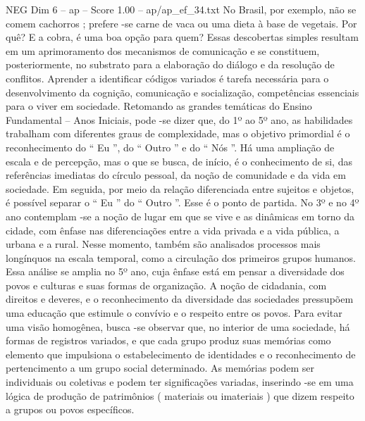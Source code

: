 \begin{textsample}{NEG Dim 6 – ap – Score 1.00 – ap/ap\_ef\_34.txt}
No Brasil, por exemplo, não se comem cachorros ; prefere -se carne de vaca ou uma dieta à base de vegetais.
Por quê?
E a cobra, é uma boa opção para quem?
Essas descobertas simples resultam em um aprimoramento dos mecanismos de comunicação e se constituem, posteriormente, no substrato para a elaboração do diálogo e da resolução de conflitos.
Aprender a identificar códigos variados é tarefa necessária para o desenvolvimento da cognição, comunicação e socialização, competências essenciais para o viver em sociedade.
Retomando as grandes temáticas do Ensino Fundamental – Anos Iniciais, pode -se dizer que, do 1º ao 5º ano, as habilidades trabalham com diferentes graus de complexidade, mas o objetivo primordial é o reconhecimento do “ Eu ”, do “ Outro ” e do “ Nós ”.
Há uma ampliação de escala e de percepção, mas o que se busca, de início, é o conhecimento de si, das referências imediatas do círculo pessoal, da noção de comunidade e da vida em sociedade.
Em seguida, por meio da relação diferenciada entre sujeitos e objetos, é possível separar o “ Eu ” do “ Outro ”.
Esse é o ponto de partida.
No 3º e no 4º ano contemplam -se a noção de lugar em que se vive e as dinâmicas em torno da cidade, com ênfase nas diferenciações entre a vida privada e a vida pública, a urbana e a rural.
Nesse momento, também são analisados processos mais longínquos na escala temporal, como a circulação dos primeiros grupos humanos.
Essa análise se amplia no 5º ano, cuja ênfase está em pensar a diversidade dos povos e culturas e suas formas de organização.
A noção de cidadania, com direitos e deveres, e o reconhecimento da diversidade das sociedades pressupõem uma educação que estimule o convívio e o respeito entre os povos.
Para evitar uma visão homogênea, busca -se observar que, no interior de uma sociedade, há formas de registros variados, e que cada grupo produz suas memórias como elemento que impulsiona o estabelecimento de identidades e o reconhecimento de pertencimento a um grupo social determinado.
As memórias podem ser individuais ou coletivas e podem ter significações variadas, inserindo -se em uma lógica de produção de patrimônios ( materiais ou imateriais ) que dizem respeito a grupos ou povos específicos.

\end{textsample}
